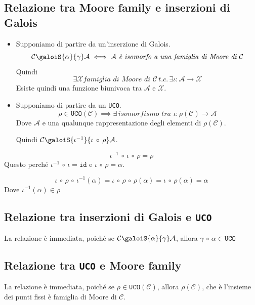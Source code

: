 \subsection{Relazione tra Moore family e inserzioni di Galois}
\begin{itemize}
    \item Supponiamo di partire da un'inserzione di Galois.
    \[
        \mathcal{C} \galoiS{\alpha}{\gamma} \mathcal{A} \iff \mathcal{A} \textit{ è isomorfo a una famiglia di 
        Moore di } \mathcal{C}
    \]
    Quindi
    \[
      \exists \mathcal{X} \textit{famiglia di Moore di } \mathcal{C} \, t.c. \, 
      \exists \iota : \mathcal{A} \rightarrow \mathcal{X}
    \]
    Esiste quindi una funzione biunivoca tra $\mathcal{A}$ e $\mathcal{X}$.
    \item Supponiamo di partire da un \texttt{UCO}.
    \[
        \rho \in \texttt{UCO}(\mathcal{C}) \implies \exists \, \textit{isomorfismo tra }
        \iota: \rho(\mathcal{C}) \to \mathcal{A}
    \]
    Dove $\mathcal{A}$ e una qualunque rappresentazione degli elementi di $\rho(\mathcal{C})$.
    
    Quindi $\mathcal{C} \galoiS{\iota^{-1}}{  \iota\,\circ\,\rho} \mathcal{A}$.
\end{itemize}
\begin{tcolorbox}
    \[
        \iota^{-1} \, \circ \, \iota \, \circ \, \rho = \rho
    \]
    Questo perché $\iota^{-1} \, \circ \, \iota = \texttt{id}$ e $\iota \, \circ \, \rho = \alpha$.

    \[
        \iota \, \circ \, \rho \, \circ \, \iota^{-1}(\alpha) 
        = \iota \, \circ \, \rho \, \circ \, \rho(\alpha) 
        = \iota \, \circ \, \rho(\alpha)  = \alpha
    \]
    Dove $\iota^{-1}(\alpha) \in \rho$
\end{tcolorbox}
\subsection{Relazione tra inserzioni di Galois e \texttt{UCO}}
La relazione è immediata, poiché se $\mathcal{C} \galoiS{\alpha}{\gamma} \mathcal{A}$, allora 
$\gamma \, \circ \, \alpha \in \texttt{UCO}$
\subsection{Relazione tra \texttt{UCO} e Moore family}
La relazione è immediata, poiché se $\rho \in \texttt{UCO}(\mathcal{C})$, allora $\rho(\mathcal{C})$, che 
è l'insieme dei punti fissi è famiglia di Moore di $\mathcal{C}$.
